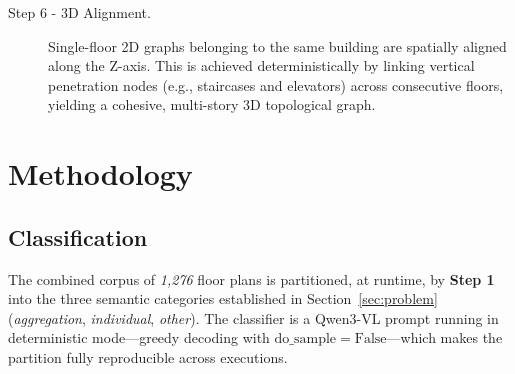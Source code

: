 \documentclass[12pt,a4paper,openright]{report}
\begin{document}
\begin{description}
    \item[Step 6 - 3D Alignment.] Single-floor 2D graphs belonging to the same building are spatially aligned along the Z-axis. This is achieved deterministically by linking vertical penetration nodes (e.g., staircases and elevators) across consecutive floors, yielding a cohesive, multi-story 3D topological graph.
\end{description}




\chapter{Methodology}
\label{ch:methodology}

\section{Classification}
\label{sec:classification}

The combined corpus of \textit{1,276} floor plans is partitioned, at runtime, by \textbf{Step 1} into the three semantic categories established in Section~\ref{sec:problem} (\textit{aggregation}, \textit{individual}, \textit{other}). The classifier is a Qwen3-VL prompt running in deterministic mode---greedy decoding with $\text{do\_sample} = \mathrm{False}$---which makes the partition fully reproducible across executions.
\end{document}
